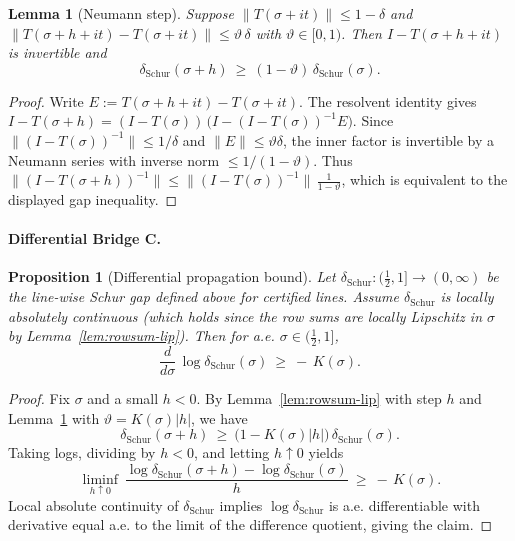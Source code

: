 \documentclass[11pt]{article}
\newtheorem{proposition}[theorem]{Proposition}
\newtheorem{lemma}[theorem]{Lemma}
\theoremstyle{definition}
\theoremstyle{remark}
\begin{document}
\begin{lemma}[Neumann step]\label{lem:neumann-step}
Suppose $\|T(\sigma+it)\|\le 1-\delta$ and $\|T(\sigma+h+it)-T(\sigma+it)\|\le \vartheta\,\delta$ with $\vartheta\in[0,1)$. Then $I-T(\sigma+h+it)$ is invertible and
\[
  \delta_{\mathrm{Schur}}(\sigma+h)\ \ge\ (1-\vartheta)\,\delta_{\mathrm{Schur}}(\sigma).
\]
\end{lemma}
\begin{proof}
Write $E:=T(\sigma+h+it)-T(\sigma+it)$. The resolvent identity gives $I-T(\sigma+h)= (I-T(\sigma))\,\big(I-(I-T(\sigma))^{-1}E\big)$. Since $\|(I-T(\sigma))^{-1}\|\le 1/\delta$ and $\|E\|\le \vartheta\delta$, the inner factor is invertible by a Neumann series with inverse norm $\le 1/(1-\vartheta)$. Thus $\|(I-T(\sigma+h))^{-1}\|\le \|(I-T(\sigma))^{-1}\|\,\frac{1}{1-\vartheta}$, which is equivalent to the displayed gap inequality.
\end{proof}

\paragraph{Differential Bridge C.}
\begin{proposition}[Differential propagation bound]\label{prop:diff-bridgeC}
Let $\delta_{\mathrm{Schur}}:(\tfrac12,1]\to(0,\infty)$ be the line-wise Schur gap defined above for certified lines. Assume $\delta_{\mathrm{Schur}}$ is locally absolutely continuous (which holds since the row sums are locally Lipschitz in $\sigma$ by Lemma~\ref{lem:rowsum-lip}). Then for a.e. $\sigma\in(\tfrac12,1]$,
\[
  \frac{d}{d\sigma}\,\log \delta_{\mathrm{Schur}}(\sigma)\ \ge\ -\,K(\sigma).
\]
\end{proposition}

\begin{proof}
Fix $\sigma$ and a small $h<0$. By Lemma~\ref{lem:rowsum-lip} with step $h$ and Lemma~\ref{lem:neumann-step} with $\vartheta=K(\sigma)|h|$, we have
\[
  \delta_{\mathrm{Schur}}(\sigma+h)\ \ge\ \big(1-K(\sigma)|h|\big)\,\delta_{\mathrm{Schur}}(\sigma).
\]
Taking logs, dividing by $h<0$, and letting $h\uparrow 0$ yields
\[
  \liminf_{h\uparrow 0}\ \frac{\log\delta_{\mathrm{Schur}}(\sigma+h)-\log\delta_{\mathrm{Schur}}(\sigma)}{h}\ \ge\ -\,K(\sigma).
\]
Local absolute continuity of $\delta_{\mathrm{Schur}}$ implies $\log\delta_{\mathrm{Schur}}$ is a.e. differentiable with derivative equal a.e. to the limit of the difference quotient, giving the claim.
\end{proof}
\end{document}
